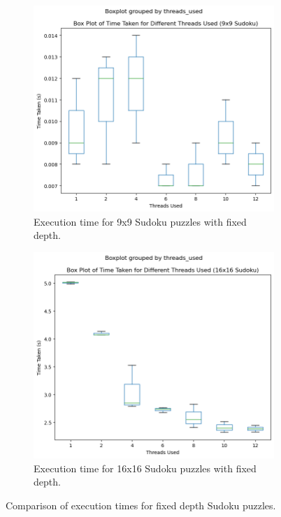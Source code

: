 \documentclass[a4paper,11pt]{article}
\begin{document}
\begin{figure}[H]
    \centering
    \begin{subfigure}[b]{0.35\textwidth}
        \centering
        \includegraphics[width=\textwidth]{9x9_fixed_depth.png}
        \caption{Execution time for 9x9 Sudoku puzzles with fixed depth.}
    \end{subfigure}
    \hfill
    \begin{subfigure}[b]{0.35\textwidth}
        \centering
        \includegraphics[width=\textwidth]{16x16_fixed_depth.png}
        \caption{Execution time for 16x16 Sudoku puzzles with fixed depth.}
    \end{subfigure}
    \caption{Comparison of execution times for fixed depth Sudoku puzzles.}
\end{figure}
\end{document}
